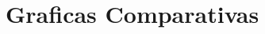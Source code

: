 \documentclass[11pt,a4paper]{article}
\begin{document}
\section*{Graficas Comparativas}

\end{document}
